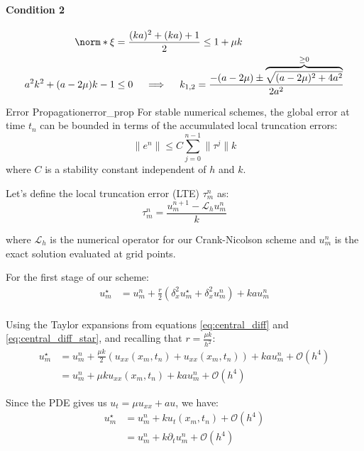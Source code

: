 \paragraph{Condition 2}
\begin{align*}
  \norm*{\xi}                & = \frac{(ka)^2 + (ka) + 1}{2} \leq 1 + \mu k                                                                       \\
  a^2 k^2 + (a - 2\mu) k - 1 & \leq 0 \quad \implies \quad k_{1,2} = \frac{-(a - 2\mu) \pm \overbrace{\sqrt{(a - 2\mu)^2 + 4a^2}}^{\geq 0}}{2a^2} \\
\end{align*}



\begin{lemma}{Error Propagation}{error_prop}
  For stable numerical schemes, the global error at time $t_n$ can be bounded in terms of the accumulated local truncation errors:
  \[
    \|e^n\| \leq C \sum_{j=0}^{n-1} \|\tau^j\| k
  \]
  where $C$ is a stability constant independent of $h$ and $k$.
\end{lemma}



Let's define the local truncation error (LTE) $\tau_m^n$ as:
\[
  \tau_m^n = \frac{u_m^{n+1} - \mathcal{L}_h u_m^n}{k}
\]

where $\mathcal{L}_h$ is the numerical operator for our Crank-Nicolson scheme and $u_m^n$ is the exact solution evaluated at grid points.

For the first stage of our scheme:
\begin{align}
  u_m^\star & = u_m^n + \frac{r}{2}(\delta_x^2 u_m^\star + \delta_x^2 u_m^n) + k a u_m^n \\
\end{align}

Using the Taylor expansions from equations \eqref{eq:central_diff} and \eqref{eq:central_diff_star}, and recalling that $r = \frac{\mu k}{h^2}$:
\begin{align}
  u_m^\star & = u_m^n + \frac{\mu k}{2}(u_{xx}(x_m,t_n) + u_{xx}(x_m,t_n)) + k a u_m^n + \mathcal{O}(h^4) \\
            & = u_m^n + \mu k u_{xx}(x_m,t_n) + k a u_m^n + \mathcal{O}(h^4)
\end{align}

Since the PDE gives us $u_t = \mu u_{xx} + au$, we have:
\begin{align}
  u_m^\star & = u_m^n + k u_t(x_m,t_n) + \mathcal{O}(h^4)     \\
            & = u_m^n + k \partial_t u_m^n + \mathcal{O}(h^4)
\end{align}

